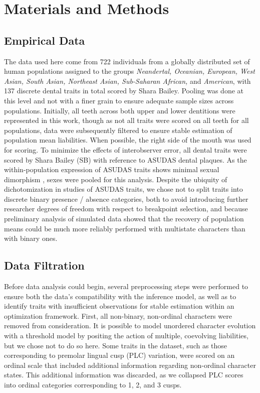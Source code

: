 \clearpage

\section{Materials and Methods}


\subsection{Empirical Data}

The data used here come from 722 individuals from a globally distributed set of human populations assigned to the groups \textit{Neandertal, Oceanian, European, West Asian, South Asian, Northeast Asian, Sub-Saharan African,} and \textit{American}, with 137 discrete dental traits in total scored by Shara Bailey. Pooling was done at this level and not with a finer grain to ensure adequate sample sizes across populations. Initially, all teeth across both upper and lower dentitions were represented in this work, though as not all traits were scored on all teeth for all populations, data were subsequently filtered to ensure stable estimation of population mean liabilities. When possible, the right side of the mouth was used for scoring. To minimize the effects of interobserver error, all dental traits were scored by Shara Bailey (SB) with reference to ASUDAS dental plaques. As the within-population expression of ASUDAS traits shows minimal sexual dimorphism \citep{scottAnthropologyModernHuman2018}, sexes were pooled for this analysis. Despite the ubiquity of dichotomization in studies of ASUDAS traits, we chose not to split traits into discrete binary presence / absence categories, both to avoid introducing further researcher degrees of freedom with respect to breakpoint selection, and because preliminary analysis of simulated data showed that the recovery of population means could be much more reliably performed with multistate characters than with binary ones.

\subsection{Data Filtration}

Before data analysis could begin, several preprocessing steps were performed to ensure both the data's compatibility with the inference model, as well as to identify traits with insufficient observations for stable estimation within an optimization framework. First, all non-binary, non-ordinal characters were removed from consideration. It is possible to model unordered character evolution with a threshold model by positing the action of multiple, coevolving liabilities, but we chose not to do so here. Some traits in the dataset, such as those corresponding to premolar lingual cusp (PLC) variation, were scored on an ordinal scale that included additional information regarding non-ordinal character states. This additional information was discarded, as we collapsed PLC scores into ordinal categories corresponding to 1, 2, and 3 cusps.

